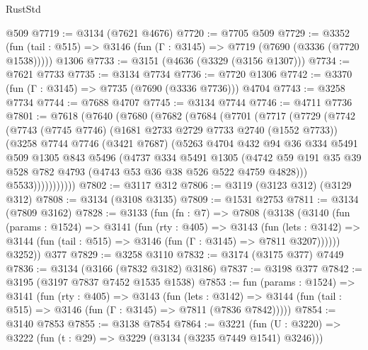 \begin{lexlean}{RustStd}
\begin{coremodule}
    @509
@7719 := @3134 (@7621 @4676)
@7720 := @7705 @509
@7729 := @3352
    (fun (tail : @515) => @3146 (fun (Γ : @3145) => @7719 (@7690 (@3336 (@7720 @1538)))))
    @1306
@7733 := @3151 (@4636 (@3329 (@3156 @1307)))
@7734 := @7621 @7733
@7735 := @3134 @7734
@7736 := @7720 @1306
@7742 := @3370 (fun (Γ : @3145) => @7735 (@7690 (@3336 @7736))) @4704
@7743 := @3258 @7734
@7744 := @7688 @4707
@7745 := @3134 @7744
@7746 := @4711 @7736
@7801 := @7618
    (@7640
      (@7680
        (@7682
          (@7684
            (@7701
              (@7717
                (@7729
                  (@7742
                    (@7743
                      (@7745 @7746)
                      (@1681 @2733 @2729 @7733 @2740 (@1552 @7733))
                      (@3258
                        @7744
                        @7746
                        (@3421 @7687)
                        (@5263
                          @4704
                          @432
                          @94
                          @36
                          @334
                          @5491
                          @509
                          @1305
                          @843
                          @5496
                          (@4737
                            @334
                            @5491
                            @1305
                            (@4742
                              @59
                              @191
                              @35
                              @39
                              @528
                              @782
                              @4793
                              (@4743 @53 @36 @38 @526 @522 @4759 @4828)))
                          @5533)))))))))))
@7802 := @3117 @312
@7806 := @3119 (@3123 @312) (@3129 @312)
@7808 := @3134 (@3108 @3135)
@7809 := @1531 @2753
@7811 := @3134 (@7809 @3162)
@7828 := @3133
    (fun (fn : @7) =>
    @7808
      (@3138
        (@3140
          (fun (params : @1524) =>
          @3141
            (fun (rty : @405) =>
            @3143
              (fun (lets : @3142) =>
              @3144 (fun (tail : @515) => @3146 (fun (Γ : @3145) => @7811 @3207))))))
        @3252))
    @377
@7829 := @3258 @3110
@7832 := @3174 (@3175 @377) @7449
@7836 := @3134 (@3166 (@7832 @3182) @3186)
@7837 := @3198 @377
@7842 := @3195 (@3197 @7837 @7452 @1535 @1538)
@7853 := fun (params : @1524) =>
  @3141
    (fun (rty : @405) =>
    @3143
      (fun (lets : @3142) =>
      @3144 (fun (tail : @515) => @3146 (fun (Γ : @3145) => @7811 (@7836 @7842)))))
@7854 := @3140 @7853
@7855 := @3138 @7854
@7864 := @3221 (fun (U : @3220) => @3222 (fun (t : @29) => @3229 (@3134 (@3235 @7449 @1541) @3246)))

\end{coremodule}
\end{lexlean}
